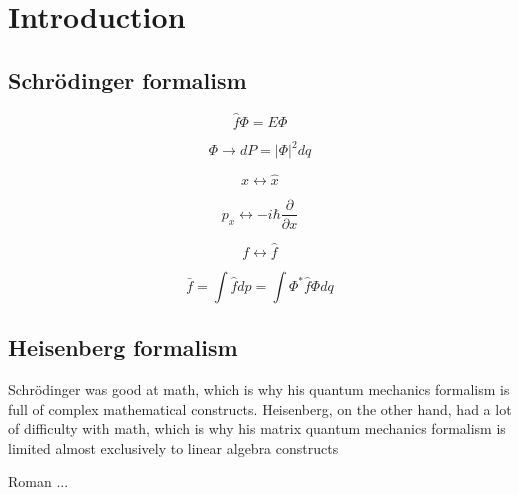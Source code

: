 \section{Introduction}
	\subsection{Schr\"odinger formalism}
	
		\begin{equation}
			\hat{f}\Phi =  E \Phi
		\end{equation}
	
		\begin{equation}
			\Phi \rightarrow dP = |\Phi|^2dq
		\end{equation}
		
		\begin{equation}
			x \leftrightarrow \hat{x}
		\end{equation}

		\begin{equation}
			p_x \leftrightarrow -i\hbar \frac{\partial}{\partial x}
		\end{equation}
	
		\begin{equation}
			f \leftrightarrow \hat{f}
		\end{equation}	
		
		\begin{equation}
			\bar{f} = \int \hat{f}dp = \int \Phi^* \hat{f} \Phi dq 
		\end{equation}
	
	\subsection{Heisenberg formalism}
		\epigraph{Schr\"odinger was good at math, which is why his quantum mechanics formalism is full of complex mathematical constructs. Heisenberg, on the other hand, had a lot of difficulty with math, which is why his matrix quantum mechanics formalism is limited almost exclusively to linear algebra constructs}{Roman ... }
	
